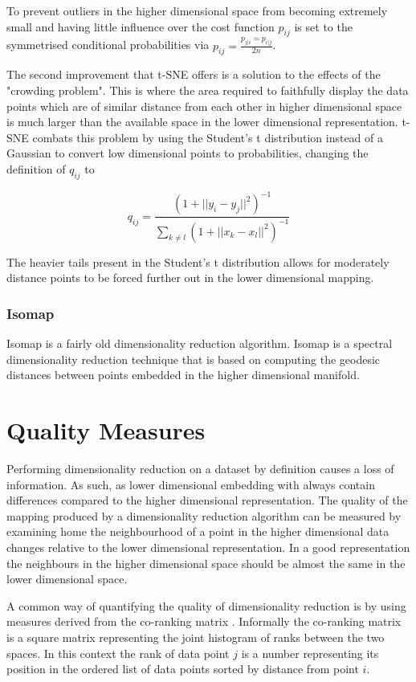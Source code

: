 To prevent outliers in the higher dimensional space from becoming extremely small and having little influence over the cost function $p_{ij}$ is set to the symmetrised conditional probabilities via $p_{ij} = \frac{p_{j|i} = p_{i|j}}{2n}$.

The second improvement that t-SNE offers is a solution to the effects of the "crowding problem". This is where the area required to faithfully display the data points which are of similar distance from each other in higher dimensional space is much larger than the available space in the lower dimensional representation. t-SNE combats this problem by using the Student's t distribution instead of a Gaussian to convert low dimensional points to probabilities, changing the definition of $q_{ij}$ to

\begin{equation}
	q_{ij} = \frac{(1 + ||y_i - y_j ||^2)^{-1}}{\sum_{k\neq l} (1 + ||x_k - x_l ||^2)^{-1}} 
\end{equation}

The heavier tails present in the Student's t distribution allows for moderately distance points to be forced further out in the lower dimensional mapping. 

\subsubsection{Isomap}
Isomap is a fairly old dimensionality reduction algorithm. Isomap is a spectral dimensionality reduction technique that is based on computing the geodesic distances between points embedded in the higher dimensional manifold.

\section{Quality Measures}
Performing dimensionality reduction on a dataset by definition causes a loss of information. As such, as lower dimensional embedding with always contain differences compared to the higher dimensional representation. The quality of the mapping produced by a dimensionality reduction algorithm can be measured by examining home the neighbourhood of a point in the higher dimensional data changes relative to the lower dimensional representation. In a good representation the neighbours in the higher dimensional space should be almost the same in the lower dimensional space. 

A common way of quantifying the quality of dimensionality reduction is by using measures derived from the co-ranking matrix \cite{lee2008rank}. Informally the co-ranking matrix is a square matrix representing the joint histogram of ranks between the two spaces. In this context the rank of data point $j$ is a number representing its position in the ordered list of data points sorted by distance from point $i$.

